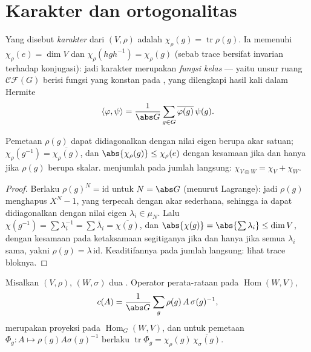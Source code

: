 \section{Karakter dan ortogonalitas}

\begin{definition}\label{def:b3:representations:character}
Yang disebut \emph{karakter} dari $(V, \rho)$ adalah
$\chi_\rho(g) = \operatorname{tr}\rho(g)$. Ia memenuhi
$\chi_\rho(e) = \dim V$ dan $\chi_\rho(hgh^{-1}) = \chi_\rho(g)$
(sebab trace bersifat invarian terhadap konjugasi): jadi karakter merupakan \emph{fungsi
kelas} --- yaitu unsur ruang
$\mathcal{CF}(G)$ berisi fungsi yang konstan pada ,
yang dilengkapi hasil kali dalam Hermite
\[
\langle \varphi, \psi\rangle = \frac1{\abs G}\sum_{g \in G}
\overline{\varphi(g)}\,\psi(g).
\]
\end{definition}

\begin{proposition}\label{prop:b3:representations:charbasics}
Pemetaan $\rho(g)$ dapat didiagonalkan dengan nilai eigen berupa akar satuan;
$\chi_\rho(g^{-1}) = \overline{\chi_\rho(g)}$, dan
$\abs{\chi_\rho(g)} \leq \chi_\rho(e)$ dengan kesamaan jika dan hanya jika
$\rho(g)$ berupa skalar.  menjumlah pada jumlah langsung: $\chi_{V
\oplus W} = \chi_V + \chi_W$.
\end{proposition}

\begin{proof}
Berlaku $\rho(g)^N = \mathrm{id}$ untuk $N = \abs G$ (menurut Lagrange): jadi $\rho(g)$
menghapus $X^N - 1$, yang terpecah dengan akar sederhana, sehingga ia dapat
didiagonalkan dengan nilai eigen $\lambda_i \in \mu_N$. Lalu
$\chi(g^{-1}) = \sum \lambda_i^{-1} = \sum\bar\lambda_i =
\overline{\chi(g)}$, dan $\abs{\chi(g)} = \abs{\sum\lambda_i}
\leq \dim V$, dengan kesamaan pada ketaksamaan segitiganya jika dan hanya jika semua
$\lambda_i$ sama, yakni $\rho(g) = \lambda\,\mathrm{id}$.
Keaditifannya pada jumlah langsung: lihat trace bloknya.
\end{proof}

\begin{lemma}\label{lem:b3:representations:homtrace}
Misalkan $(V, \rho)$, $(W, \sigma)$ dua . Operator
perata-rataan pada $\operatorname{Hom}(W, V)$,
\[
c(A) = \frac1{\abs G}\sum_{g}\rho(g)\,A\,\sigma(g)^{-1},
\]
merupakan proyeksi pada $\operatorname{Hom}_G(W, V)$, dan untuk
pemetaan $\Phi_g \colon A \mapsto \rho(g)A\sigma(g)^{-1}$ berlaku
$\operatorname{tr}\Phi_g =
\chi_\rho(g)\,\overline{\chi_\sigma(g)}$.
\end{lemma}

